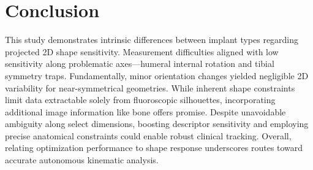 \section{Conclusion}
This study demonstrates intrinsic differences between implant types regarding projected 2D shape sensitivity.
Measurement difficulties aligned with low sensitivity along problematic axes—humeral internal rotation and tibial symmetry traps.
Fundamentally, minor orientation changes yielded negligible 2D variability for near-symmetrical geometries.
While inherent shape constraints limit data extractable solely from fluoroscopic silhouettes, incorporating additional image information like bone offers promise.
Despite unavoidable ambiguity along select dimensions, boosting descriptor sensitivity and employing precise anatomical constraints could enable robust clinical tracking.
Overall, relating optimization performance to shape response underscores routes toward accurate autonomous kinematic analysis.

